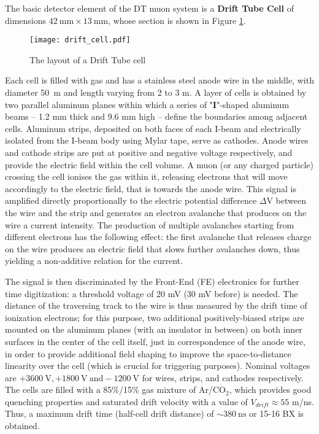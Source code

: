 \documentclass[12pt,twoside,a4paper]{report}
\numberwithin{equation}{section}
\begin{document}
The basic detector element of the DT muon system is a \textbf{Drift Tube Cell} of dimensions $42\ \mathrm{mm} \times 13\ \mathrm{mm}$, whose section is shown in Figure \ref{fig:tube}.
\begin{figure}[!htb]
\texttt{[image: drift\_cell.pdf]}
\caption{\label{fig:tube} The layout of a Drift Tube cell}
\end{figure}
Each cell is filled with gas and has a stainless steel anode wire in the middle, with diameter 50\ \textmu m and length varying from 2 to 3 m. A layer of cells is obtained by two parallel aluminum planes within which a series of "\textbf{I}"-shaped aluminum beams -- 1.2 mm thick and 9.6 mm high -- define the boundaries among adjacent cells. Aluminum strips, deposited on both faces of each I-beam and electrically isolated from the I-beam body using Mylar tape, serve as cathodes. Anode wires and cathode strips are put at positive and negative voltage respectively, and provide the electric field within the cell volume.
A muon (or any charged particle) crossing the cell ionises the gas within it, releasing electrons that will move accordingly to the electric field, that is towards the anode wire. This signal is amplified directly proportionally to the electric potential difference $\Delta \mathrm{V}$ between the wire and the strip and generates an electron avalanche that produces on the wire a current intensity.
The production of multiple avalanches starting from different electrons has the following effect: the first avalanche that releases charge on the wire produces an electric field that slows further avalanches down, thus yielding a non-additive relation for the current.

The signal is then discriminated by the Front-End (FE) electronics for further time digitization: a threshold voltage of 20 mV (30 mV before) is needed. The distance of the traversing track to the wire is thus measured by the drift time of ionization electrons; for this purpose, two additional positively-biased strips are mounted on the aluminum planes (with an insulator in between) on both inner surfaces in the center of the cell itself, just in correspondence of the anode wire, in order to provide additional field shaping to improve the space-to-distance linearity over the cell (which is crucial for triggering purposes). Nominal voltages are $+3600\ \mathrm{V}, +1800\ \mathrm{V}\ \mathrm{and} -1200\ \mathrm{V}$ for wires, strips, and cathodes respectively. The cells are filled with a 85\%/15\% gas mixture of Ar/$\mathrm{CO}_{2}$, which provides good quenching properties and saturated drift velocity with a value of $V_{drift} \approx 55$ \textmu m/ns. Thus, a maximum drift time (half-cell drift distance) of $\sim 380\ \mathrm{ns}$ or 15-16 BX is obtained.
\end{document}
